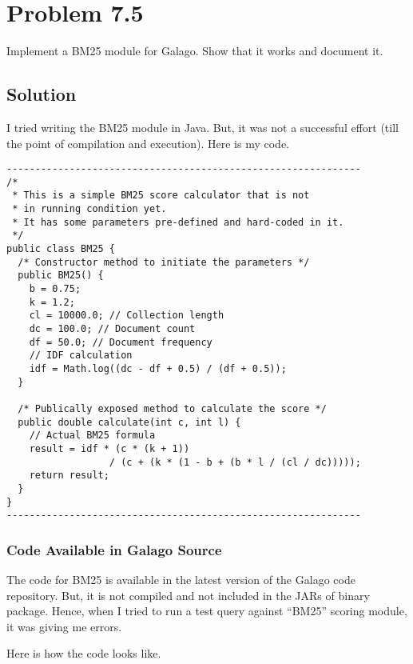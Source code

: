 \documentclass[letterpaper,12pt]{article}
\begin{document}
\pagebreak



\section{Problem 7.5}

Implement a BM25 module for Galago. Show that it works and document it.

\subsection{Solution}

I tried writing the BM25 module in Java. But, it was not a successful effort (till the point of compilation and execution). Here is my code.

\begin{verbatim}
--------------------------------------------------------------
/*
 * This is a simple BM25 score calculator that is not
 * in running condition yet.
 * It has some parameters pre-defined and hard-coded in it.
 */
public class BM25 {
  /* Constructor method to initiate the parameters */
  public BM25() {
    b = 0.75;
    k = 1.2;
    cl = 10000.0; // Collection length
    dc = 100.0; // Document count
    df = 50.0; // Document frequency
    // IDF calculation
    idf = Math.log((dc - df + 0.5) / (df + 0.5));
  }

  /* Publically exposed method to calculate the score */
  public double calculate(int c, int l) {
    // Actual BM25 formula
    result = idf * (c * (k + 1))
                  / (c + (k * (1 - b + (b * l / (cl / dc)))));
    return result;
  }
}
--------------------------------------------------------------
\end{verbatim}


\subsubsection{Code Available in Galago Source}

The code for BM25 is available in the latest version of the Galago code repository. But, it is not compiled and not included in the JARs of binary package. Hence, when I tried to run a test query against ``BM25'' scoring module, it was giving me errors.

Here is how the code looks like.
\end{document}
